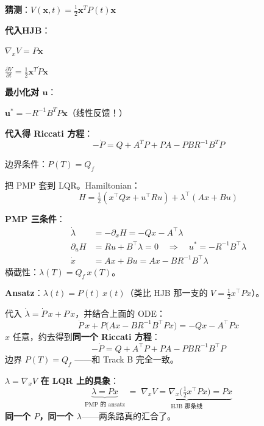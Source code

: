 \documentclass[12pt, a4paper]{ctexart}
\begin{document}
\begin{blackboard}[LQR的HJB解]

\textbf{猜测}：$V(\mathbf{x}, t) = \frac{1}{2}\mathbf{x}^T P(t) \mathbf{x}$

\textbf{代入HJB}：

$\nabla_x V = P\mathbf{x}$

$\frac{\partial V}{\partial t} = \frac{1}{2}\mathbf{x}^T \dot{P} \mathbf{x}$

\textbf{最小化对 $\mathbf{u}$}：

$\mathbf{u}^* = -R^{-1} B^T P \mathbf{x}$（线性反馈！）

\textbf{代入得 Riccati 方程}：
\[
-\dot{P} = Q + A^T P + PA - PBR^{-1}B^T P
\]

边界条件：$P(T) = Q_f$

\end{blackboard}

\begin{blackboard}

把 PMP 套到 LQR。Hamiltonian：
\[
H = \tfrac{1}{2}(x^\top Q x + u^\top R u) + \lambda^\top(Ax + Bu)
\]

\textbf{PMP 三条件}：
\begin{align*}
\dot\lambda &= -\partial_x H = -Qx - A^\top \lambda \\
\partial_u H &= R u + B^\top \lambda = 0
\quad\Longrightarrow\quad u^* = -R^{-1} B^\top \lambda \\
\dot x &= Ax + Bu = Ax - B R^{-1} B^\top \lambda
\end{align*}
横截性：$\lambda(T) = Q_f\, x(T)$。

\textbf{Ansatz}：$\lambda(t) = P(t)\, x(t)$（类比 HJB 那一支的 $V = \tfrac{1}{2}x^\top P x$）。

代入 $\dot\lambda = \dot P\, x + P\,\dot x$，并结合上面的 ODE：
\[
\dot P\, x + P\big(Ax - B R^{-1} B^\top P x\big) = -Q x - A^\top P x
\]
$x$ 任意，约去得到\textbf{同一个 Riccati 方程}：
\[
-\dot P = Q + A^\top P + P A - P B R^{-1} B^\top P
\]
边界 $P(T) = Q_f$ ——和 Track B 完全一致。

\textbf{$\lambda = \nabla_x V$ 在 LQR 上的具象}：
\[
\underbrace{\lambda = P x}_{\text{PMP 的 ansatz}}
\;=\;
\underbrace{\nabla_x V = \nabla_x \big(\tfrac{1}{2} x^\top P x\big) = P x}_{\text{HJB 那条线}}
\]
\textbf{同一个 $P$，同一个 $\lambda$}——两条路真的汇合了。

\end{blackboard}
\end{document}
